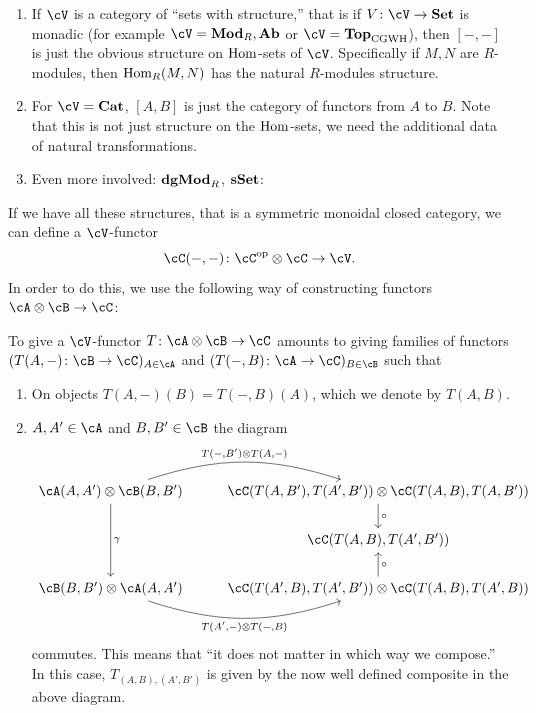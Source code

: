 \documentclass[a4paper,11pt,oneside,openany]{scrbook}
\begin{document}
\begin{exmp}
	\begin{enumerate}[label=\arabic*)]
		\item
		      If $ \cV $ is a category of ``sets with structure,'' that is if $
              V \from \cV \to \Set $ is monadic (for example $ \cV = \Mod_R,\Ab
              $ or $ \cV = \Top_{\mathrm{CGWH}} $), then $ [-,-] $ is just the
              obvious structure on $\operatorname{\text{Hom}}$-sets of $\cV$. Specifically if $ M,N $
              are $ R $-modules, then $\operatorname{\text{Hom}}_R(M,N)$ has the natural $ R
              $-modules structure.
		\item For $\cV=\Cat$, $[A,B]$ is just the category of functors from $A$
            to $B$. Note that this is not just structure on the $\operatorname{\text{Hom}}$-sets, we
            need the additional data of natural transformations.
		\item Even more involved: ${\normalfont\textbf{dgMod}}_R$, ${\normalfont\textbf{sSet}}$:
	\end{enumerate}
\end{exmp}
If we have all these structures, that is a symmetric monoidal closed category,
we can define a $\cV$-functor
\begin{displaymath}
	\cC(-,-)\from\cC^{\op}\otimes\cC\to\cV.
\end{displaymath}
In order to do this, we use the following way of constructing functors
$\cA\otimes\cB\to\cC$:
\begin{prop}
	To give a $\cV$-functor $T\from\cA\otimes\cB\to\cC$ amounts to
    giving families of functors $(T(A,-)\from\cB\to\cC)_{A\in\cA}$ and
    $(T(-,B)\from\cA\to\cC)_{B\in\cB}$ such that
	\begin{enumerate}[label=\roman*)]
		\item On objects $T(A,-)(B)=T(-,B)(A)$, which we denote by $T(A,B)$.
        \item $A,A'\in\cA$ and $B,B'\in\cB$ the diagram
		      \begin{displaymath}
			      \begin{tikzcd}%
				      \cA(A,A')\otimes \cB(B,B')
				      \arrow[r, "{T(-,B')\otimes T(A,-)}", bend left=18]
				      \arrow[dd, "\gamma"]
				      &
				      \cC(T(A,B') ,T(A',B')) \otimes \cC(T(A,B) ,T(A,B'))
				      \arrow[d, "\circ"]
				      \\
				      & \cC(T(A,B),T(A',B'))
				      \\
				      \cB(B,B') \otimes \cA(A,A')
				      \arrow[r, "{T(A',-)\otimes T(-,B)}"', bend right=18]
				      & \cC(T(A',B) ,T(A',B')) \otimes \cC(T(A,B) ,T(A',B))
				      \arrow[u, "\circ"']
			      \end{tikzcd}
		      \end{displaymath}
		      commutes.
		      This means that ``it does not matter in which way we compose.''
		      In this case, $ T_{(A,B),(A',B')}  $ is given by the now well defined composite in the above diagram.
	\end{enumerate}
\end{prop}
\end{document}
